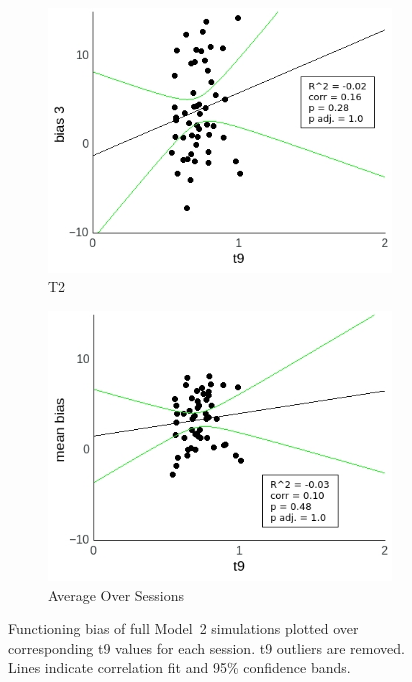 \documentclass[a4paper]{scrreprt}
\begin{document}
\begin{figure}
\begin{subfigure}[b]{0.49\textwidth}
        \includegraphics[width=\textwidth]{figs/sec3/t9/t9no_diff_3_mod2mod2.jpeg}
        \caption{T2}
    \end{subfigure}
    \begin{subfigure}[b]{0.49\textwidth}
        \includegraphics[width=\textwidth]{figs/sec3/t9/t9no_diff_mean_mod2mod2.jpeg}
        \caption{Average Over Sessions}
    \end{subfigure}
\caption{Functioning bias of full Model~2 simulations plotted over corresponding t9 values for each session. t9 outliers are removed. Lines indicate correlation fit and 95\% confidence bands.}
\label{fig:t9no_diff_mod2mod2}
\end{figure}
\end{document}
